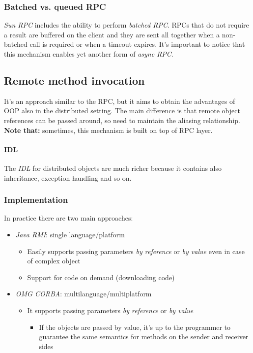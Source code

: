 \subsubsection{Batched vs. queued RPC}
\textit{Sun RPC} includes the ability to perform \textit{batched RPC}. RPCs that do not require a result are buffered on the client and they are sent all together when a non-batched call is required or when a timeout expires. It's important to notice that this mechanism enables yet another form of \textit{async RPC}.

\subsection{Remote method invocation}

It's an approach similar to the RPC, but it aims to obtain the advantages of OOP also in the distributed setting. The main difference is that remote object references can be passed around, so need to maintain the aliasing relationship.\\
\textbf{Note that:} sometimes, this mechanism is built on top of RPC layer.

\paragraph{IDL}
The \textit{IDL} for distributed objects are much richer because it contains also inheritance, exception handling and so on.

\subsubsection{Implementation}
In practice there are two main approaches:

\begin{itemize}
\item \emph{Java RMI}: single language/platform
\begin{itemize}
    \item Easily supports passing parameters \textit{by reference} or \textit{by value} even in case of complex object
    \item Support for code on demand (downloading code)
\end{itemize}

\item \emph{OMG CORBA}: multilanguage/multiplatform
    \begin{itemize}
        \item It supports passing parameters \textit{by reference} or \textit{by value}
        \begin{itemize}
            \item If the objects are passed by value, it's up to the programmer to guarantee the same semantics for methods on the   sender and receiver sides
        \end{itemize}
    \end{itemize}
\end{itemize}

